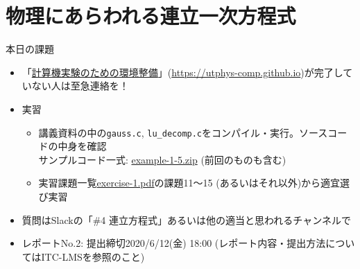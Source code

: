 \documentclass[10pt,dvipdfmx]{beamer}
\begin{document}
\section{物理にあらわれる連立一次方程式}








\begin{frame}[t]{本日の課題}
  \begin{itemize}
  \item 「\href{https://utphys-comp.github.io}{計算機実験のための環境整備}」({\small \href{https://utphys-comp.github.io}{https://utphys-comp.github.io}})が完了していない人は至急連絡を！
  \item 実習
    \begin{itemize}
    \item 講義資料の中の{\tt gauss.c}, {\tt lu\_decomp.c}をコンパイル・実行。ソースコードの中身を確認 \\
      サンプルコード一式: \href{https://github.com/todo-group/ComputerExperiments/releases/tag/2020s-computer1}{example-1-5.zip} (前回のものも含む)
    \item 実習課題一覧\href{https://github.com/todo-group/ComputerExperiments/releases/tag/2020s-computer1}{exercise-1.pdf}の課題11〜15 (あるいはそれ以外)から適宜選び実習
    \end{itemize}
  \item 質問はSlackの「\#4 連立方程式」あるいは他の適当と思われるチャンネルで \\[2em]
    
  \item レポートNo.2: 提出締切2020/6/12(金) 18:00 (レポート内容・提出方法についてはITC-LMSを参照のこと)
  \end{itemize}
\end{frame}
\end{document}
